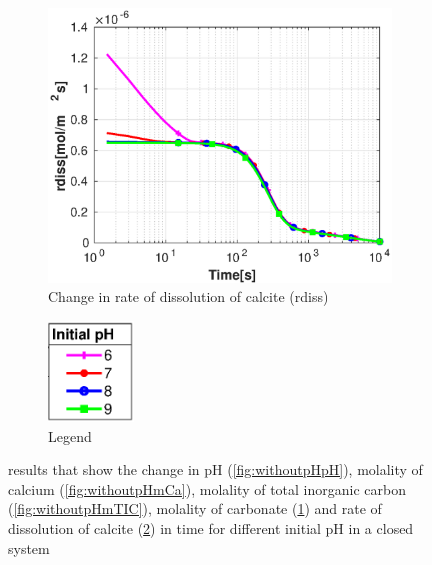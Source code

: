 \begin{figure}[!h]
\begin{subfigure}{.5\linewidth}
        \label{fig:withoutpHmCO3}
    \end{subfigure}%
    \hfill
    \begin{subfigure}{.5\linewidth}
            \centering
        \includegraphics[width=\textwidth]{PICTURES/without_pH_rdiss.eps}
        \caption{Change in rate of dissolution of calcite (rdiss)}
        \label{fig:withoutpHrdiss}
    \end{subfigure}%
  \hfill
  \begin{subfigure}{.5\linewidth}
            \centering
        \includegraphics[width=0.25\textwidth]{PICTURES/with_pH_legend.eps}
        \caption{Legend}
        \label{fig:withoutpHlegend}
    \end{subfigure}%
    \caption{\DuMuX results that show the change in pH (\cref{fig:withoutpHpH}), molality of calcium (\cref{fig:withoutpHmCa}), molality of total inorganic carbon (\cref{fig:withoutpHmTIC}), molality of carbonate (\cref{fig:withoutpHmCO3}) and rate of dissolution of calcite (\cref{fig:withoutpHrdiss}) in time for different initial pH in a closed system}
    
    \label{fig:comparisionWithoutDiffInitialpH}
\end{figure}


